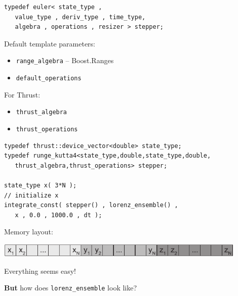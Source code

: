 \begin{frame}[fragile]


\begin{lstlisting}
typedef euler< state_type ,
   value_type , deriv_type , time_type,
   algebra , operations , resizer > stepper; 
\end{lstlisting}

Default template parameters:

\begin{itemize}
 \item {\tt range\_algebra} -- Boost.Ranges
 \item {\tt default\_operations}
\end{itemize}

\vspace{2ex}
For Thrust:

\begin{itemize}
 \item {\tt thrust\_algebra}
 \item {\tt thrust\_operations}
\end{itemize}

 
\end{frame}



\begin{frame}[fragile]


 \begin{lstlisting}[basicstyle=\scriptsize\ttfamily]
typedef thrust::device_vector<double> state_type;
typedef runge_kutta4<state_type,double,state_type,double,
   thrust_algebra,thrust_operations> stepper; 

state_type x( 3*N );
// initialize x
integrate_const( stepper() , lorenz_ensemble() ,
   x , 0.0 , 1000.0 , dt );
 \end{lstlisting}

\vspace{2ex}

\centerline{Memory layout:}

\vspace{1ex}

\centerline{\includegraphics[draft=false,width=0.9\textwidth]{memory_layout.pdf}}

\vspace{6ex}

\centerline{Everything seems easy!}
\vspace{2ex}
\centerline{{\bf But} how does {\tt lorenz\_ensemble} look like?}
 

\end{frame}




